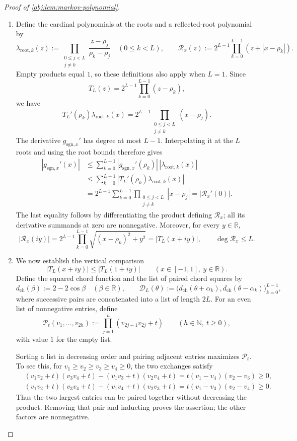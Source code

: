 \documentclass[11pt]{article}
\begin{document}
\begin{proof}[Proof of \cref{obj:lem:markov-polynomial}]
\begin{enumerate}
\item Define the cardinal polynomials at the roots and a reflected-root polynomial by
\[
\lambda_{\mathrm{root},k}(z):=
\prod_{\substack{0\le j<L\\j\ne k}}
\frac{z-\rho_j}{\rho_k-\rho_j}
\quad(0\le k<L),
\qquad
\mathcal R_x(z):=
2^{L-1}\prod_{k=0}^{L-1}(z+|x-\rho_k|).
\]
Empty products equal \(1\), so these definitions also apply when \(L=1\).
Since
\[
T_L(z)=2^{L-1}\prod_{k=0}^{L-1}(z-\rho_k),
\]
we have
\[
T_L'(\rho_k)\lambda_{\mathrm{root},k}(x)
=
2^{L-1}\prod_{\substack{0\le j<L\\j\ne k}}(x-\rho_j).
\]
The derivative \(g_{\mathrm{sgn},x}'\) has degree at most \(L-1\). Interpolating it at the \(L\) roots and using the root bounds therefore gives
\[
\begin{aligned}
|g_{\mathrm{sgn},x}'(x)|
&\le\sum_{k=0}^{L-1}
|g_{\mathrm{sgn},x}'(\rho_k)|\,
|\lambda_{\mathrm{root},k}(x)|\\
&\le\sum_{k=0}^{L-1}
|T_L'(\rho_k)\lambda_{\mathrm{root},k}(x)|\\
&=2^{L-1}\sum_{k=0}^{L-1}
\prod_{\substack{0\le j<L\\j\ne k}}|x-\rho_j|
=|\mathcal R_x'(0)|.
\end{aligned}
\]
The last equality follows by differentiating the product defining
\(\mathcal R_x\); all its derivative summands at zero are nonnegative.
Moreover, for every \(y\in\mathbb R\),
\[
|\mathcal R_x(iy)|
=2^{L-1}\prod_{k=0}^{L-1}
\sqrt{(x-\rho_k)^2+y^2}
=|T_L(x+iy)|,
\qquad
\deg\mathcal R_x\le L.
\]

\item We now establish the vertical comparison
\[
|T_L(x+iy)|\le |T_L(1+iy)|
\qquad(x\in[-1,1],\ y\in\mathbb R).
\]
Define the squared chord function and the list of paired chord squares by
\[
d_{\mathrm{ch}}(\beta):=2-2\cos\beta
\quad(\beta\in\mathbb R),
\qquad
\mathscr D_L(\theta):=
\bigl(d_{\mathrm{ch}}(\theta+\alpha_k),
      d_{\mathrm{ch}}(\theta-\alpha_k)\bigr)_{k=0}^{L-1},
\]
where successive pairs are concatenated into a list of length \(2L\).
For an even list of nonnegative entries, define
\[
\mathcal P_t(v_1,\ldots,v_{2h})
:=\prod_{j=1}^{h}(v_{2j-1}v_{2j}+t)
\qquad(h\in\mathbb N,\ t\ge0),
\]
with value \(1\) for the empty list.

Sorting a list in decreasing order and pairing adjacent entries maximizes
\(\mathcal P_t\). To see this, for
\(v_1\ge v_2\ge v_3\ge v_4\ge0\), the two exchanges satisfy
\[
\begin{aligned}
&(v_1v_2+t)(v_3v_4+t)
 -(v_1v_3+t)(v_2v_4+t)
=t(v_1-v_4)(v_2-v_3)\ge0,\\
&(v_1v_2+t)(v_3v_4+t)
 -(v_1v_4+t)(v_2v_3+t)
=t(v_1-v_3)(v_2-v_4)\ge0.
\end{aligned}
\]
Thus the two largest entries can be paired together without decreasing the product. Removing that pair and inducting proves the assertion; the other factors are nonnegative.


\end{enumerate}
\end{proof}
\end{document}
